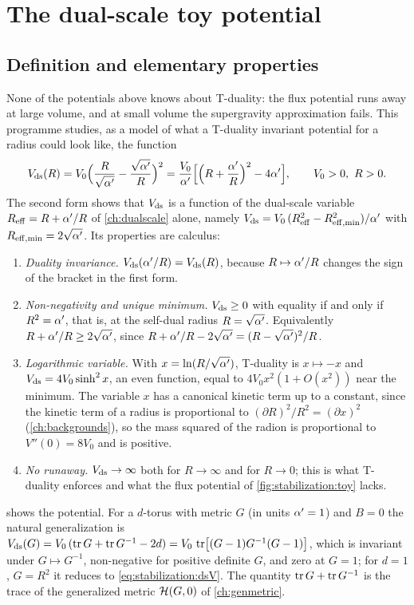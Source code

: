 \section{The dual-scale toy potential}\label{sec:stabilization:dualscale}

\subsection{Definition and elementary properties}

None of the potentials above knows about T-duality: the flux potential runs away at large
volume, and at small volume the supergravity approximation fails. This programme studies, as
a model of what a T-duality invariant potential for a radius could look like, the function
\begin{equation}\label{eq:stabilization:dsV}
 V_{\rm ds}(R)=V_0\Bigl(\frac{R}{\sqrt{\alpha'}}-\frac{\sqrt{\alpha'}}{R}\Bigr)^{2}
 =\frac{V_0}{\alpha'}\Bigl[\Bigl(R+\frac{\alpha'}{R}\Bigr)^2-4\alpha'\Bigr],\qquad V_0>0,\ R>0 .
\end{equation}
The second form shows that $V_{\rm ds}$ is a function of the dual-scale variable
$R_{\rm eff}=R+\alpha'/R$ of \cref{ch:dualscale} alone, namely
$V_{\rm ds}=V_0\,(R_{\rm eff}^2-R_{\rm eff,min}^2)/\alpha'$ with $R_{\rm eff,min}=2\sqrt{\alpha'}$. Its
properties are calculus:
\begin{enumerate}[leftmargin=*,itemsep=1pt]
\item \emph{Duality invariance.} $V_{\rm ds}(\alpha'/R)=V_{\rm ds}(R)$, because $R\mapsto\alpha'/R$
 changes the sign of the bracket in the first form.
\item \emph{Non-negativity and unique minimum.} $V_{\rm ds}\ge0$ with equality if and only if
 $R^2=\alpha'$, that is, at the self-dual radius $R=\sqrt{\alpha'}$. Equivalently
 $R+\alpha'/R\ge2\sqrt{\alpha'}$, since $R+\alpha'/R-2\sqrt{\alpha'}=(R-\sqrt{\alpha'})^2/R$.
\item \emph{Logarithmic variable.} With $x=\ln(R/\sqrt{\alpha'})$, T-duality is $x\mapsto-x$ and
 $V_{\rm ds}=4V_0\sinh^2x$, an even function, equal to $4V_0x^2(1+O(x^2))$ near the minimum. The
 variable $x$ has a canonical kinetic term up to a constant, since the kinetic term of
 a radius is proportional to $(\partial R)^2/R^2=(\partial x)^2$ (\cref{ch:backgrounds}), so
 the mass squared of the radion is proportional to $V''(0)=8V_0$ and is positive.
\item \emph{No runaway.} $V_{\rm ds}\to\infty$ both for $R\to\infty$ and for $R\to0$; this is
 what T-duality enforces and what the flux potential of \cref{fig:stabilization:toy} lacks.
\end{enumerate}
 shows the potential. For a $d$-torus with metric $G$ (in units
$\alpha'=1$) and $B=0$ the natural generalization is
$V_{\rm ds}(G)=V_0\,(\operatorname{tr} G+\operatorname{tr} G^{-1}-2d)=V_0\,\operatorname{tr}\bigl[(G-1)G^{-1}(G-1)\bigr]$, which is
invariant under $G\mapsto G^{-1}$, non-negative for positive definite $G$, and zero at
$G=1$; for $d=1$, $G=R^2$ it reduces to \eqref{eq:stabilization:dsV}. The quantity
$\operatorname{tr} G+\operatorname{tr} G^{-1}$ is the trace of the generalized metric $\mathcal{H}(G,0)$ of \cref{ch:genmetric}.

